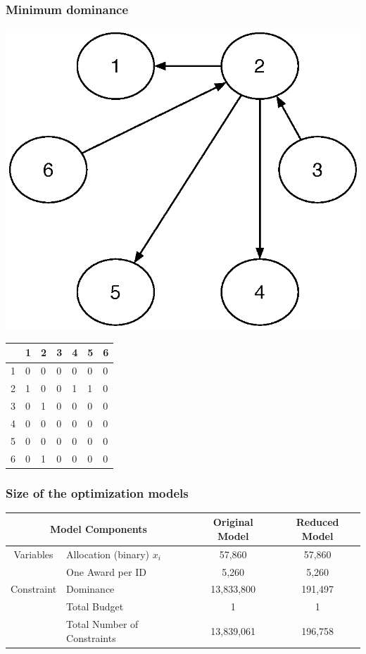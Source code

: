 \documentclass{beamer}
\begin{document}
\begin{frame}
\frametitle{Minimum dominance}
\begin{center}
 \includegraphics[scale = 0.4]{pic/dominance3.eps}
\end{center}
 
\begin{center}
 \begin{tabular}{l|llllll}
        & 1 & 2 & 3 & 4 & 5 & 6 \\ \hline
        1 & 0 & 0 & 0 & 0 & 0 & 0 \\
        2 & 1 & 0 & 0 & 1 & 1 & 0 \\
        3 & 0 & 1 & 0 & 0 & 0 & 0 \\
        4 & 0 & 0 & 0 & 0 & 0 & 0 \\
        5 & 0 & 0 & 0 & 0 & 0 & 0 \\
        6 & 0 & 1 & 0 & 0 & 0 & 0
    \end{tabular}
\end{center}
    
\end{frame}


\begin{frame}
\frametitle{Size of the optimization models}

\centering
\scriptsize{
\begin{tabular}{|c|l|c|c|}
\hline %
\multicolumn{2}{|c|}{Model Components}   &
Original Model & Reduced Model \\ \hline
Variables                   & \multicolumn{1}{|l|}{Allocation (binary) 
$x_i$}
& 57,860         & 57,860        \\ \hline
\multirow{3}{*}{Constraint} & One Award per ID         &
5,260          & 5,260         \\ \cline{2-4}
& Dominance                & 13,833,800     & 191,497
\\ \cline{2-4}
& Total Budget              & 1              & 1
\\ \cline{2-4}
& Total Number of Constraints     & 13,839,061     & 196,758
\\ \hline
\end{tabular}
}


\end{frame}
\end{document}
